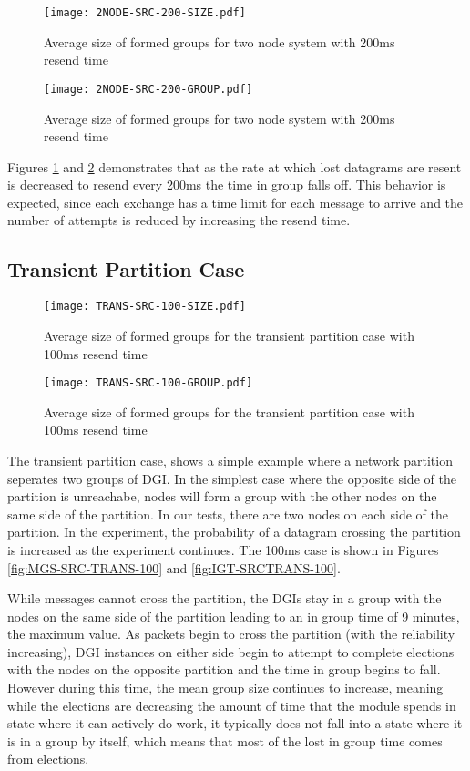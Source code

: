 \begin{figure}[!h]
\centering
\texttt{[image: 2NODE-SRC-200-SIZE.pdf]}
\caption{Average size of formed groups for two node system with 200ms resend time}
\label{fig:MGS-SRC-2NODE-200}
\end{figure}

\begin{figure}[!h]
\centering
\texttt{[image: 2NODE-SRC-200-GROUP.pdf]}
\caption{Average size of formed groups for two node system with 200ms resend time}
\label{fig:IGT-SRC-2NODE-200}
\end{figure}

Figures \ref{fig:MGS-SRC-2NODE-200} and \ref{fig:IGT-SRC-2NODE-200} demonstrates that as the
rate at which lost datagrams are resent is decreased to resend every 200ms the
time in group falls off. This behavior is expected, since each exchange has a
time limit for each message to arrive and the number of attempts is reduced by
increasing the resend time.

\subsection{Transient Partition Case}

\begin{figure}[!h]
\centering
\texttt{[image: TRANS-SRC-100-SIZE.pdf]}
\caption{Average size of formed groups for the transient partition case with 100ms resend time}
\label{fig:MGS-TRANS-100}
\end{figure}

\begin{figure}[!h]
\centering
\texttt{[image: TRANS-SRC-100-GROUP.pdf]}
\caption{Average size of formed groups for the transient partition case with 100ms resend time}
\label{fig:IGT-TRANS-100}
\end{figure}

The transient partition case, shows a simple example where a network partition
seperates two groups of DGI. In the simplest case where the opposite side of
the partition is unreachabe, nodes will form a group with the other nodes on the
same side of the partition. In our tests, there are two nodes on each side of
the partition. In the experiment, the probability of a datagram crossing the
partition is increased as the experiment continues. The 100ms case is shown in
Figures \ref{fig:MGS-SRC-TRANS-100} and \ref{fig:IGT-SRCTRANS-100}.

While messages cannot cross the partition, the DGIs stay in a group with the
nodes on the same side of the partition leading to an in group time of 9 minutes,
the maximum value. As packets begin to cross the partition (with the reliability
increasing), DGI instances on either side begin to attempt to complete elections
with the nodes on the opposite partition and the time in group begins to fall.
However during this time, the mean group size continues to increase, meaning
while the elections are decreasing the amount of time that the module spends in
state where it can actively do work, it typically does not fall into a state
where it is in a group by itself, which means that most of the lost in group
time comes from elections.

